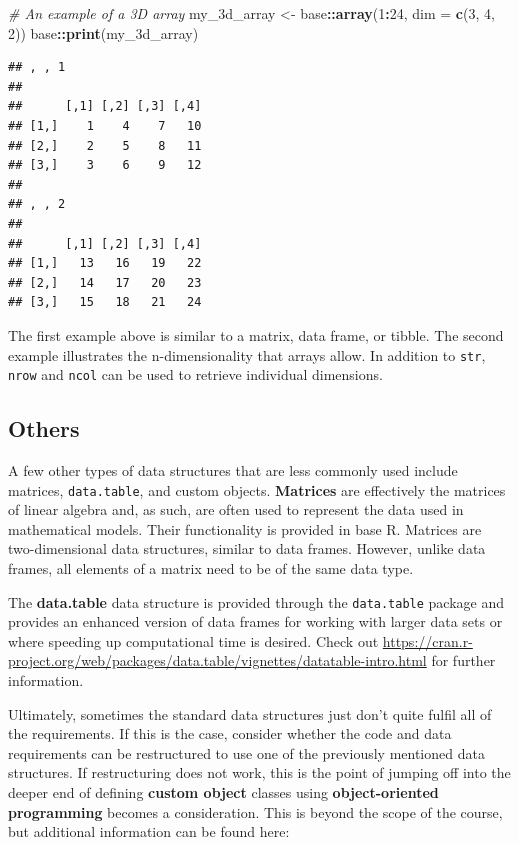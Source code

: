 \documentclass[
]{book}
\newenvironment{Shaded}{\begin{snugshade}}{\end{snugshade}}
\newcommand{\AttributeTok}[1]{\textcolor[rgb]{0.13,0.29,0.53}{#1}}
\newcommand{\CommentTok}[1]{\textcolor[rgb]{0.56,0.35,0.01}{\textit{#1}}}
\newcommand{\DecValTok}[1]{\textcolor[rgb]{0.00,0.00,0.81}{#1}}
\newcommand{\FunctionTok}[1]{\textcolor[rgb]{0.13,0.29,0.53}{\textbf{#1}}}
\newcommand{\NormalTok}[1]{#1}
\newcommand{\OtherTok}[1]{\textcolor[rgb]{0.56,0.35,0.01}{#1}}
\newcommand{\SpecialCharTok}[1]{\textcolor[rgb]{0.81,0.36,0.00}{\textbf{#1}}}
\begin{document}
\begin{Shaded}
\begin{Highlighting}[]
\CommentTok{\# An example of a 3D array }
\NormalTok{my\_3d\_array }\OtherTok{\textless{}{-}}\NormalTok{ base}\SpecialCharTok{::}\FunctionTok{array}\NormalTok{(}\DecValTok{1}\SpecialCharTok{:}\DecValTok{24}\NormalTok{, }\AttributeTok{dim =} \FunctionTok{c}\NormalTok{(}\DecValTok{3}\NormalTok{, }\DecValTok{4}\NormalTok{, }\DecValTok{2}\NormalTok{))}
\NormalTok{base}\SpecialCharTok{::}\FunctionTok{print}\NormalTok{(my\_3d\_array)}
\end{Highlighting}
\end{Shaded}

\begin{verbatim}
## , , 1
## 
##      [,1] [,2] [,3] [,4]
## [1,]    1    4    7   10
## [2,]    2    5    8   11
## [3,]    3    6    9   12
## 
## , , 2
## 
##      [,1] [,2] [,3] [,4]
## [1,]   13   16   19   22
## [2,]   14   17   20   23
## [3,]   15   18   21   24
\end{verbatim}

The first example above is similar to a matrix, data frame, or tibble. The second example illustrates the n-dimensionality that arrays allow. In addition to \texttt{str}, \texttt{nrow} and \texttt{ncol} can be used to retrieve individual dimensions.

\subsection{Others}\label{sec:OtherDataTypes}

A few other types of data structures that are less commonly used include matrices, \texttt{data.table}, and custom objects. \textbf{Matrices} are effectively the matrices of linear algebra and, as such, are often used to represent the data used in mathematical models. Their functionality is provided in base R. Matrices are two-dimensional data structures, similar to data frames. However, unlike data frames, all elements of a matrix need to be of the same data type.

The \textbf{data.table} data structure is provided through the \texttt{data.table} package and provides an enhanced version of data frames for working with larger data sets or where speeding up computational time is desired. Check out \url{https://cran.r-project.org/web/packages/data.table/vignettes/datatable-intro.html} for further information.

Ultimately, sometimes the standard data structures just don't quite fulfil all of the requirements. If this is the case, consider whether the code and data requirements can be restructured to use one of the previously mentioned data structures. If restructuring does not work, this is the point of jumping off into the deeper end of defining \textbf{custom object} classes using \textbf{object-oriented programming} becomes a consideration. This is beyond the scope of the course, but additional information can be found here:
\end{document}
